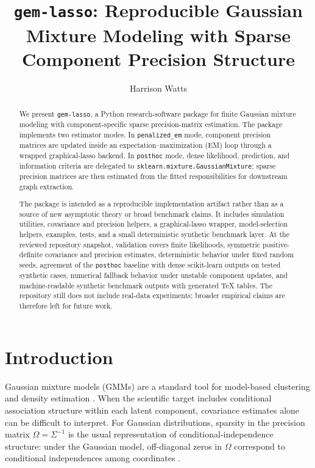 \documentclass[10pt]{article}
\title{\texttt{gem-lasso}: Reproducible Gaussian Mixture Modeling with Sparse Component Precision Structure}
\author{Harrison Watts}
\date{}
\begin{document}
\maketitle

\begin{abstract}
We present \texttt{gem-lasso}, a Python research-software package for finite
Gaussian mixture modeling with component-specific sparse precision-matrix
estimation. The package implements two estimator modes. In
\texttt{penalized\_em} mode, component precision matrices are updated inside an
expectation--maximization (EM) loop through a wrapped graphical-lasso backend.
In \texttt{posthoc} mode, dense likelihood, prediction, and information
criteria are delegated to \texttt{sklearn.mixture.GaussianMixture}; sparse
precision matrices are then estimated from the fitted responsibilities for
downstream graph extraction.

The package is intended as a reproducible implementation artifact rather than
as a source of new asymptotic theory or broad benchmark claims. It includes
simulation utilities, covariance and precision helpers, a graphical-lasso
wrapper, model-selection helpers, examples, tests, and a small deterministic
synthetic benchmark layer. At the reviewed repository snapshot, validation
covers finite likelihoods, symmetric positive-definite covariance and precision
estimates, deterministic behavior under fixed random seeds, agreement of the
\texttt{posthoc} baseline with dense scikit-learn outputs on tested synthetic
cases, numerical fallback behavior under unstable component updates, and
machine-readable synthetic benchmark outputs with generated TeX tables. The
repository still does not include real-data experiments; broader empirical
claims are therefore left for future work.
\end{abstract}

\section{Introduction}

Gaussian mixture models (GMMs) are a standard tool for model-based clustering
and density estimation \citep{TODO_gmm_source,TODO_model_based_clustering}.
When the scientific target includes conditional association structure within
each latent component, covariance estimates alone can be difficult to interpret.
For Gaussian distributions, sparsity in the precision matrix
$\Omega=\Sigma^{-1}$ is the usual representation of conditional-independence
structure: under the Gaussian model, off-diagonal zeros in $\Omega$ correspond
to conditional independences among coordinates \citep{TODO_sparse_precision_source}.
\end{document}
